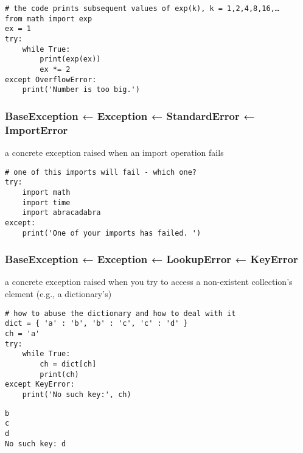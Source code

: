 \documentclass[11pt]{article}
\begin{document}
\begin{verbatim}
# the code prints subsequent values of exp(k), k = 1,2,4,8,16,…
from math import exp
ex = 1
try:
    while True:
        print(exp(ex))
        ex *= 2
except OverflowError:
    print('Number is too big.')

\end{verbatim}

\subsubsection{BaseException ← Exception ← StandardError ← ImportError}
\label{sec:org031c219}
a concrete exception raised when an import operation fails

\begin{verbatim}
# one of this imports will fail - which one?
try:
    import math
    import time
    import abracadabra
except:
    print('One of your imports has failed. ')
\end{verbatim}

\subsubsection{BaseException ← Exception ← LookupError ← KeyError}
\label{sec:orgf90538c}
a concrete exception raised when you try to access a non-existent
collection’s element (e.g., a dictionary’s)

\begin{verbatim}
# how to abuse the dictionary and how to deal with it
dict = { 'a' : 'b', 'b' : 'c', 'c' : 'd' }
ch = 'a'
try:
    while True:
        ch = dict[ch]
        print(ch)
except KeyError:
    print('No such key:', ch)

\end{verbatim}

\begin{verbatim}
b
c
d
No such key: d
\end{verbatim}
\end{document}
